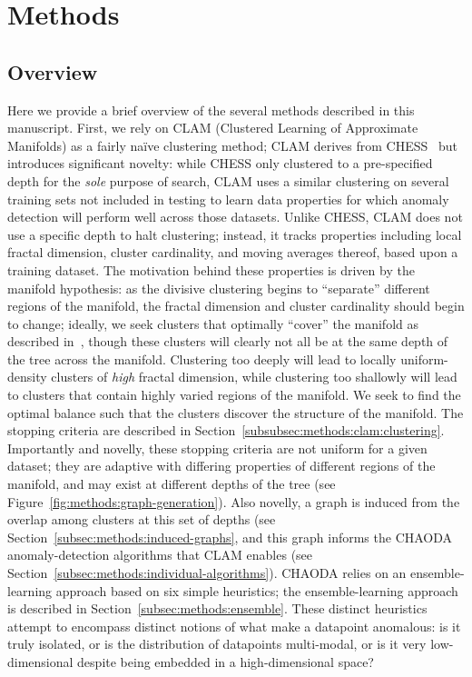 \section{Methods}
\label{sec:methods}


\subsection{Overview}
\label{subsec:methods:overview}

Here we provide a brief overview of the several methods described in this manuscript.
First, we rely on CLAM (Clustered Learning of Approximate Manifolds) as a fairly na\"ive clustering method; CLAM derives from CHESS~\cite{ishaq2019clustered} but introduces significant novelty: while CHESS only clustered to a pre-specified depth for the \emph{sole} purpose of search, CLAM uses a similar clustering on several training sets not included in testing to learn data properties for which anomaly detection will perform well across those datasets.
Unlike CHESS, CLAM does not use a specific depth to halt clustering; instead, it tracks properties including local fractal dimension, cluster cardinality, and moving averages thereof, based upon a training dataset.
The motivation behind these properties is driven by the manifold hypothesis: as the divisive clustering begins to ``separate'' different regions of the manifold, the fractal dimension and cluster cardinality should begin to change; ideally, we seek clusters that optimally ``cover'' the manifold as described in~\cite{yu2015entropy}, though these clusters will clearly not all be at the same depth of the tree across the manifold.
Clustering too deeply will lead to locally uniform-density clusters of \emph{high} fractal dimension, while clustering too shallowly will lead to clusters that contain highly varied regions of the manifold.
We seek to find the optimal balance such that the clusters discover the structure of the manifold.
The stopping criteria are described in Section~\ref{subsubsec:methods:clam:clustering}.
Importantly and novelly, these stopping criteria are not uniform for a given dataset; they are adaptive with differing properties of different regions of the manifold, and may exist at different depths of the tree (see Figure~\ref{fig:methods:graph-generation}).
Also novelly, a graph is induced from the overlap among clusters at this set of depths (see Section~\ref{subsec:methods:induced-graphs}, and this graph informs the CHAODA anomaly-detection algorithms that CLAM enables (see Section~\ref{subsec:methods:individual-algorithms}).
CHAODA relies on an ensemble-learning approach based on six simple heuristics; the ensemble-learning approach is described in Section~\ref{subsec:methods:ensemble}.
These distinct heuristics attempt to encompass distinct notions of what make a datapoint anomalous: is it truly isolated, or is the distribution of datapoints multi-modal, or is it very low-dimensional despite being embedded in a high-dimensional space?

